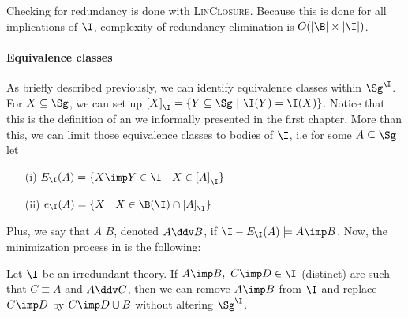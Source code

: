 \noindent Checking for redundancy is done with \textsc{LinClosure}. Because this
is done for all implications of $\I$, complexity of redundancy elimination is
$O(|\B| \times |\I|)$.

\vspace{1.2em}

\paragraph{Equivalence classes} As briefly described previously, we can identify
equivalence classes within $\Sg^{\I}$. For $X \subseteq \Sg$, we can set up
$\left[ X \right]_{\I} = \{ Y \subseteq \Sg \ | \ \I(Y) = \I(X) \}$. Notice 
that this is the definition of an  we informally 
presented in the first chapter. More than
this, we can limit those equivalence classes to bodies of $\I$, i.e for some
$A \subseteq \Sg$ let
\begin{itemize}
	\item[(i)] $E_{\I}(A) = \{ X \imp Y \in \I \ | \ X \in \left[ A 
	\right]_{\I} \}$ 
	\item[(ii)] $e_{\I}(A) =\{ X \ | \ X \in \B(\I) \cap \left[ A \right]_{\I} 
	\}$
\end{itemize}
\noindent Plus, we say that $A$  $B$, denoted $A 
\ddv B$, if $\I - E_{\I}(A) \models A \imp B$. Now, the minimization process
in \cite{maier_theory_1983, david_minimum_1980} is the following: 

\begin{proposition} Let $\I$ be an irredundant theory. If $A \imp B, \ C \imp D 
	\in \I$ (distinct) are such that $C \equiv A$ and $A \ddv C$, then we can 
	remove $A \imp B$ from $\I$ and replace $C \imp D$ by $C \imp D \cup B$ 
	without 
	altering $\Sg^{\I}$.
\end{proposition}


